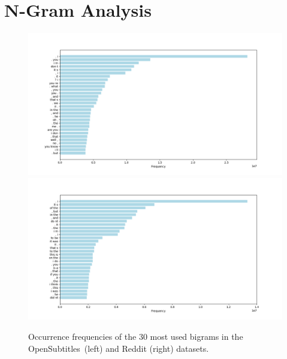 \section{N-Gram Analysis}
\blindtext
\begin{figure}[htb]
	\includegraphics[width=\linewidth]{img/opensubtitles_bigram_top_30_freq}
	\centering
	\small
	\endminipage\hfill
	\includegraphics[width=\linewidth]{img/reddit_bigram_top_30_freq}
	\centering
	\small
	\endminipage\hfill
	\caption{Occurrence frequencies of the 30 most used bigrams in the OpenSubtitles~(left) and Reddit (right) datasets.}
	\label{data:ngram:freq_top_30}
\end{figure}

